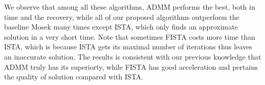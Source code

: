 \documentclass{article}
\begin{document}
We observe that among all these algorithms, ADMM performs the best, both in time and the recovery, while all of our proposed algorithms outperform the baseline Mosek many times except ISTA, which only finds an approximate solution in a very short time. Note that sometimes FISTA costs more time than ISTA, which is because ISTA gets its maximal number of iterations thus leaves an inaccurate solution. The results is consistent with our previous knowledge that ADMM truly has its superiorty, while FISTA has good acceleration and pertains the quality of solution compared with ISTA.
	
  

\end{document}
